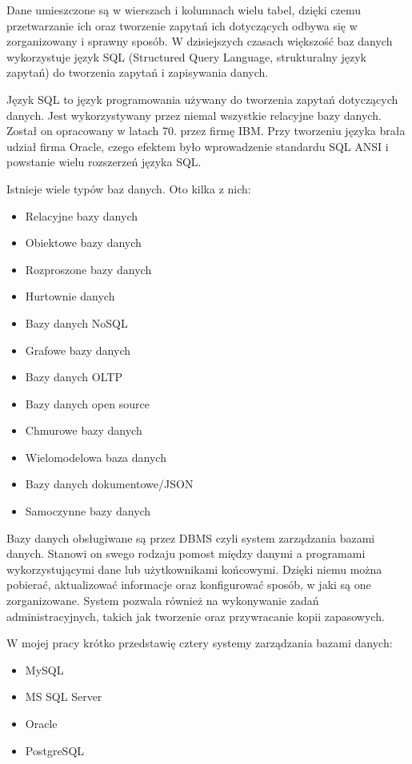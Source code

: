 \documentclass[oneside,polski,logo,indent]{amuthesis}
\begin{document}
\begin{enumerate}
\begin{enumerate}
Dane umieszczone są w wierszach i kolumnach wielu tabel, dzięki czemu przetwarzanie ich oraz tworzenie zapytań ich dotyczących odbywa się w zorganizowany i sprawny sposób. W dzisiejszych czasach większość baz danych wykorzystuje język SQL (Structured Query Language, strukturalny język zapytań) do tworzenia zapytań i zapisywania danych.  

Język SQL to język programowania używany do tworzenia zapytań dotyczących danych. Jest wykorzystywany przez niemal wszystkie relacyjne bazy danych. Został on opracowany w latach 70. przez firmę IBM. Przy tworzeniu języka brała udział firma Oracle, czego efektem było wprowadzenie standardu SQL ANSI i powstanie wielu rozszerzeń języka SQL.  

Istnieje wiele typów baz danych. Oto kilka z nich:  
\begin{itemize}
\item Relacyjne bazy danych
\item Obiektowe bazy danych
\item Rozproszone bazy danych
\item Hurtownie danych
\item Bazy danych NoSQL
\item Grafowe bazy danych
\item Bazy danych OLTP
\item Bazy danych open source
\item Chmurowe bazy danych
\item Wielomodelowa baza danych
\item Bazy danych dokumentowe/JSON
\item Samoczynne bazy danych
\end{itemize}

Bazy danych obsługiwane są przez DBMS czyli system zarządzania bazami danych. Stanowi on swego rodzaju pomost między danymi a programami wykorzystującymi dane lub użytkownikami końcowymi. Dzięki niemu można pobierać, aktualizować informacje oraz konfigurować sposób, w jaki są one zorganizowane. System pozwala również na wykonywanie zadań administracyjnych, takich jak tworzenie oraz przywracanie kopii zapasowych.


W mojej pracy krótko przedstawię cztery systemy zarządzania bazami danych: 
\begin{itemize}
\item MySQL 
\item MS SQL Server 
\item Oracle 
\item PostgreSQL 
\end{itemize}

\end{enumerate}
\end{enumerate}
\end{document}
